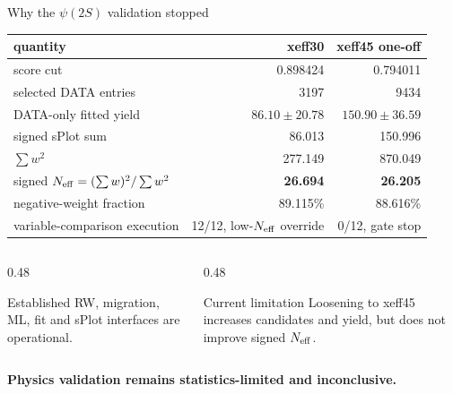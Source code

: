 \documentclass[11pt,aspectratio=169]{beamer}
\begin{document}
\begin{frame}[label=p8]{Why the $\psi(2S)$ validation stopped}
  \footnotesize
  \centering
  \renewcommand{\arraystretch}{1.15}
  \begin{tabular}{lrr}
    \toprule
    quantity & xeff30 & xeff45 one-off \\
    \midrule
    score cut & 0.898424 & 0.794011 \\
    selected DATA entries & 3197 & 9434 \\
    DATA-only fitted yield & $86.10\pm20.78$ & $150.90\pm36.59$ \\
    signed sPlot sum & 86.013 & 150.996 \\
    $\sum w^2$ & 277.149 & 870.049 \\
    signed $N_{\rm eff}=(\sum w)^2/\sum w^2$ & \textbf{26.694} & \textbf{26.205} \\
    negative-weight fraction & 89.115\% & 88.616\% \\
    variable-comparison execution & 12/12, low-$N_{\rm eff}$ override & 0/12, gate stop \\
    \bottomrule
  \end{tabular}

  \vspace{0.30em}
  \begin{columns}[T,onlytextwidth]
    \begin{column}{0.48\textwidth}
      \begin{exampleblock}{Established}
        RW, migration, ML, fit and sPlot interfaces are operational.
      \end{exampleblock}
    \end{column}
    \begin{column}{0.48\textwidth}
      \begin{alertblock}{Current limitation}
        Loosening to xeff45 increases candidates and yield, but does not improve signed $N_{\rm eff}$.
      \end{alertblock}
    \end{column}
  \end{columns}

  \vfill
  \centering\bfseries
  Physics validation remains statistics-limited and inconclusive.
\end{frame}
\end{document}
